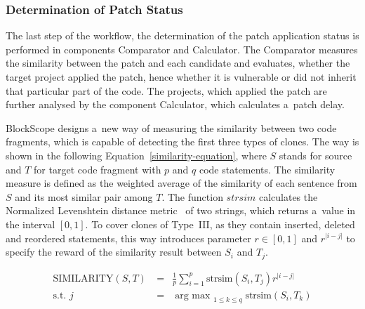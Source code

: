     \subsubsection*{Determination of Patch Status}
    The last step of the workflow, the determination of the patch application status is performed in components Comparator
    and Calculator. The Comparator measures the similarity between the patch and each candidate and evaluates, whether
    the target project applied the patch, hence whether it is vulnerable or did not inherit that particular part
    of the code. The projects, which applied the patch are further analysed by the component Calculator, which
    calculates a~patch delay.

    BlockScope designs a~new way of measuring the similarity between two code fragments, which is capable of detecting
    the first three types of clones. The way is shown in the following Equation~\ref{similarity-equation}, where
    $S$ stands for source and $T$ for target code fragment with $p$ and $q$ code statements. The similarity measure
    is defined as the weighted average of the similarity of each sentence from $S$ and its most similar pair among $T$.
    The function $strsim$ calculates the Normalized Levenshtein distance metric~\cite{strsim} of two strings, which returns a~value
    in the interval $[0, 1]$. To cover clones of Type~III, as they contain inserted, deleted and reordered statements,
    this way introduces parameter $r \in [0, 1]$ and $r^{\vert i-j \vert}$ to specify the reward of the similarity result
    between $S_i$ and $T_j$.

    \begin{equation}
      \begin{aligned}
        \text{SIMILARITY}(S, T)\ &=& \frac{1}{p} \sum \limits^p_{i=1}\text{strsim}(S_i, T_j)r^{\vert i-j \vert} \\
        \text{s.t. } j\ &=& \mathop{arg\ max\ }_{1 \leq k \leq q} \text{strsim}(S_i, T_k)
        \label{similarity-equation}
      \end{aligned}
    \end{equation}

